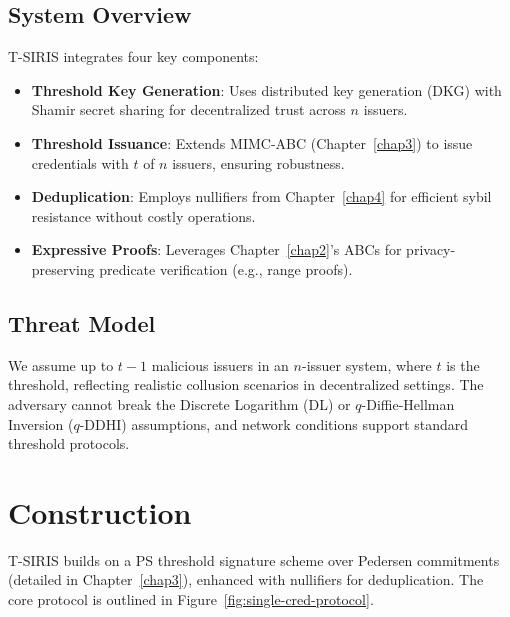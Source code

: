 \subsection{System Overview}

T-SIRIS integrates four key components:
\begin{itemize}
    \item \textbf{Threshold Key Generation}: Uses distributed key generation (DKG) with Shamir secret sharing for decentralized trust across $n$ issuers.
    \item \textbf{Threshold Issuance}: Extends MIMC-ABC (Chapter~\ref{chap3}) to issue credentials with $t$ of $n$ issuers, ensuring robustness.
    \item \textbf{Deduplication}: Employs nullifiers from Chapter~\ref{chap4} for efficient sybil resistance without costly operations.
    \item \textbf{Expressive Proofs}: Leverages Chapter~\ref{chap2}'s ABCs for privacy-preserving predicate verification (e.g., range proofs).
\end{itemize}

\subsection{Threat Model}

We assume up to $t-1$ malicious issuers in an $n$-issuer system, where $t$ is the threshold, reflecting realistic collusion scenarios in decentralized settings. The adversary cannot break the Discrete Logarithm (DL) or $q$-Diffie-Hellman Inversion ($q$-DDHI) assumptions, and network conditions support standard threshold protocols.

\section{Construction}
\label{sec:threshold-construction}

T-SIRIS builds on a PS threshold signature scheme over Pedersen commitments (detailed in Chapter~\ref{chap3}), enhanced with nullifiers for deduplication. The core protocol is outlined in Figure~\ref{fig:single-cred-protocol}.

